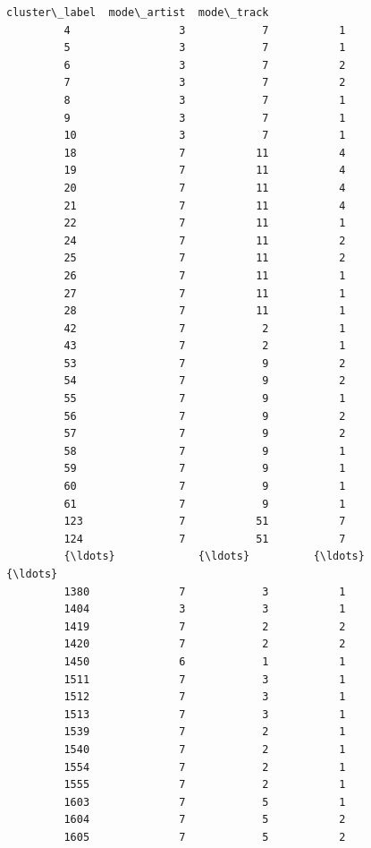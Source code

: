 \documentclass[11pt]{article}
\begin{document}
\begin{Verbatim}[commandchars=\\\{\}]
               cluster\_label  mode\_artist  mode\_track  
         4                 3            7           1  
         5                 3            7           1  
         6                 3            7           2  
         7                 3            7           2  
         8                 3            7           1  
         9                 3            7           1  
         10                3            7           1  
         18                7           11           4  
         19                7           11           4  
         20                7           11           4  
         21                7           11           4  
         22                7           11           1  
         24                7           11           2  
         25                7           11           2  
         26                7           11           1  
         27                7           11           1  
         28                7           11           1  
         42                7            2           1  
         43                7            2           1  
         53                7            9           2  
         54                7            9           2  
         55                7            9           1  
         56                7            9           2  
         57                7            9           2  
         58                7            9           1  
         59                7            9           1  
         60                7            9           1  
         61                7            9           1  
         123               7           51           7  
         124               7           51           7  
         {\ldots}             {\ldots}          {\ldots}         {\ldots}  
         1380              7            3           1  
         1404              3            3           1  
         1419              7            2           2  
         1420              7            2           2  
         1450              6            1           1  
         1511              7            3           1  
         1512              7            3           1  
         1513              7            3           1  
         1539              7            2           1  
         1540              7            2           1  
         1554              7            2           1  
         1555              7            2           1  
         1603              7            5           1  
         1604              7            5           2  
         1605              7            5           2  

\end{Verbatim}
\end{document}

